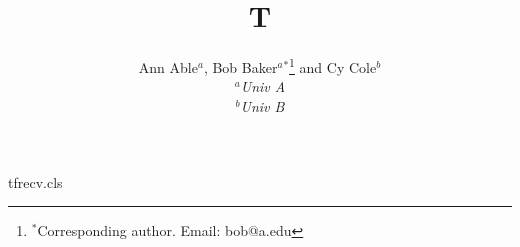 \begin{filecontents*}[overwrite]{tfrecv.cls}
\def\author#1{\gdef\@author{#1}}
\def\received#1{\gdef\@received{#1}}
\gdef\@received{Received 00 Month 200x}
\def\@maketitle{\newpage\null\vskip 2em
  \begin{center}{\LARGE\@title\par}\vskip 1em
  {\large\@author\par}\vskip 1em
  {\itshape(\@received)\par}\end{center}\par\vskip 1.5em}
\end{filecontents*}
\documentclass{tfrecv}

\title{T}
\author{Ann Able$^{a}$, Bob Baker$^{a}$$^{\ast}$\thanks{$^\ast$Corresponding author. Email: bob@a.edu} and Cy Cole$^{b}$\\
\vspace{3pt} $^{a}${\em{Univ A}}\\
\vspace{3pt} $^{b}${\em{Univ B}}\\
\vspace{3pt}}
\maketitle
Hi.

